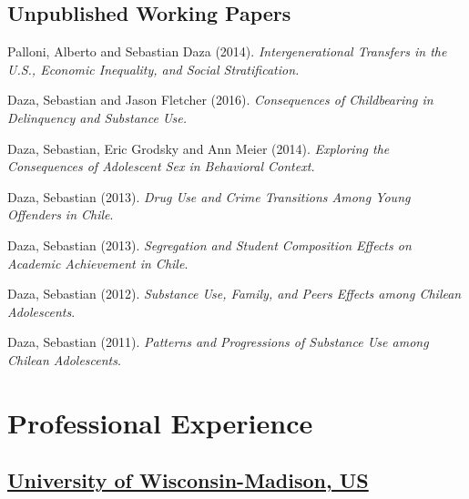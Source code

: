 \documentclass[10pt,letterpaper]{article}
\renewenvironment{itemize}{
  \begin{list}{}{
    \setlength{\leftmargin}{1.5em}
    \setlength{\itemsep}{0.25em}
    \setlength{\parskip}{0pt}
    \setlength{\parsep}{0.25em}
  }
}{
  \end{list}
}
\begin{document}
\subsection*{Unpublished Working Papers}

\begin{itemize}

\item Palloni, Alberto and Sebastian Daza (2014).
   \textit{Intergenerational Transfers in the U.S., Economic Inequality, and Social Stratification.}

\item Daza, Sebastian and Jason Fletcher (2016).
  \textit{Consequences of Childbearing in Delinquency and Substance Use.}

\item Daza, Sebastian, Eric Grodsky and Ann Meier (2014).
  \textit{Exploring the Consequences of Adolescent Sex in Behavioral Context.}

\item Daza, Sebastian (2013).
  \textit{Drug Use and Crime Transitions Among Young Offenders in Chile}.

\item Daza, Sebastian (2013).
  \textit{Segregation and Student Composition Effects on Academic Achievement in Chile}.

\item Daza, Sebastian (2012).
  \textit{Substance Use, Family, and Peers Effects among Chilean Adolescents}.

\item Daza, Sebastian (2011).
  \textit{Patterns and Progressions of Substance Use among Chilean Adolescents}.

\end{itemize}

\section*{Professional Experience}

\subsection*{\href{http://sociologia.uc.cl/}{University of Wisconsin-Madison, US}}
\end{document}
